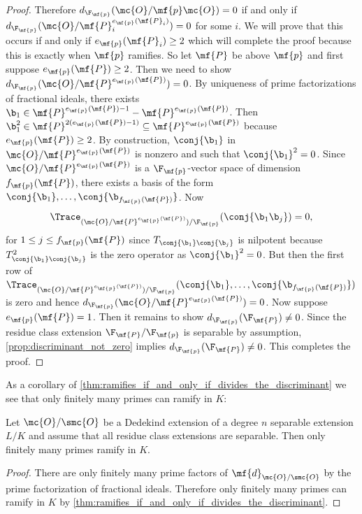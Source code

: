 \begin{proof}
      Therefore \(d_{\F_{\mf{p}}}(\mc{O}/\mf{p}\mc{O}) = 0\) if and only if \(d_{\F_{\mf{p}}}(\mc{O}/\mf{P}_{i}^{e_{\mf{p}}(\mf{P}_{i})}) = 0\) for some \(i\). We will prove that this occurs if and only if \(e_{\mf{p}}(\mf{P}_{i}) \ge 2\) which will complete the proof because this is exactly when \(\mf{p}\) ramifies. So let \(\mf{P}\) be above \(\mf{p}\) and first suppose \(e_{\mf{p}}(\mf{P}) \ge 2\). Then we need to show \(d_{\F_{\mf{p}}}(\mc{O}/\mf{P}^{e_{\mf{p}}(\mf{P})}) = 0\). By uniqueness of prime factorizations of fractional ideals, there exists \(\b_{1} \in \mf{P}^{e_{\mf{p}}(\mf{P})-1}-\mf{P}^{e_{\mf{p}}(\mf{P})}\). Then \(\b_{1}^{2} \in \mf{P}^{2(e_{\mf{p}}(\mf{P})-1)} \subseteq \mf{P}^{e_{\mf{p}}(\mf{P})}\) because \(e_{\mf{p}}(\mf{P}) \ge 2\). By construction, \(\conj{\b_{1}}\) in \(\mc{O}/\mf{P}^{e_{\mf{p}}(\mf{P})}\) is nonzero and such that \(\conj{\b_{1}}^{2} = 0\). Since \(\mc{O}/\mf{P}^{e_{\mf{p}}(\mf{P})}\) is a \(\F_{\mf{p}}\)-vector space of dimension \(f_{\mf{p}}(\mf{P})\), there exists a basis of the form \(\conj{\b_{1}},\ldots,\conj{\b_{f_{\mf{p}}(\mf{P})}}\). Now
      \[
        \Trace_{(\mc{O}/\mf{P}^{e_{\mf{p}}(\mf{P})})/\F_{\mf{p}}}(\conj{\b_{1}\b_{j}}) = 0,
      \]
      for \(1 \le j \le f_{\mf{p}}(\mf{P})\) since \(T_{\conj{\b_{1}}\conj{\b_{j}}}\) is nilpotent because \(T_{\conj{\b_{1}}\conj{\b_{j}}}^{2}\) is the zero operator as \(\conj{\b_{1}}^{2} = 0\). But then the first row of \(\Trace_{(\mc{O}/\mf{P}^{e_{\mf{p}}(\mf{P})})/\F_{\mf{p}}}(\conj{\b_{1}},\ldots,\conj{\b_{f_{\mf{p}}(\mf{P})}})\) is zero and hence \(d_{\F_{\mf{p}}}(\mc{O}/\mf{P}^{e_{\mf{p}}(\mf{P})}) = 0\). Now suppose \(e_{\mf{p}}(\mf{P}) = 1\). Then it remains to show \(d_{\F_{\mf{p}}}(\F_{\mf{P}}) \neq 0\). Since the residue class extension \(\F_{\mf{P}}/\F_{\mf{p}}\) is separable by assumption, \cref{prop:discriminant_not_zero} implies \(d_{\F_{\mf{p}}}(\F_{\mf{P}}) \neq 0\). This completes the proof.
    \end{proof}

    As a corollary of \cref{thm:ramifies_if_and_only_if_divides_the_discriminant} we see that only finitely many primes can ramify in \(K\):

    \begin{corollary}\label{cor:finitely_many_primes_ramify_K}
      Let \(\mc{O}/\smc{O}\) be a Dedekind extension of a degree \(n\) separable extension \(L/K\) and assume that all residue class extensions are separable. Then only finitely many primes ramify in \(K\).
    \end{corollary}
    \begin{proof}
      There are only finitely many prime factors of \(\mf{d}_{\mc{O}/\smc{O}}\) by the prime factorization of fractional ideals. Therefore only finitely many primes can ramify in \(K\) by \cref{thm:ramifies_if_and_only_if_divides_the_discriminant}.
    \end{proof}


